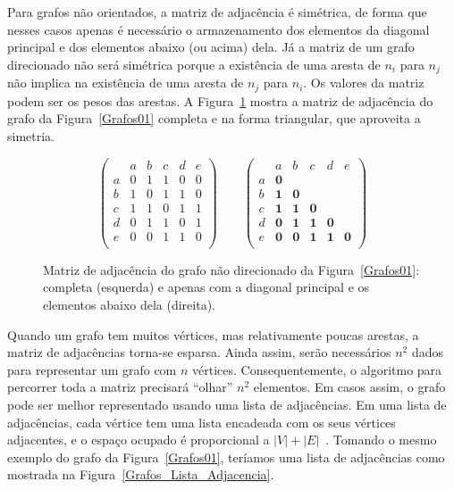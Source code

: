 \documentclass[11pt,fleqn]{book} %
\begin{document}
Para grafos não orientados, a matriz de adjacência é simétrica, de forma que nesses casos apenas é necessário o armazenamento dos elementos da diagonal principal e dos elementos abaixo (ou acima) dela.
Já a matriz de um grafo direcionado não será simétrica porque a existência de uma aresta de $n_i$ para $n_j$ não implica na existência de uma aresta de $n_j$ para $n_i$.
Os valores da matriz podem ser os pesos das arestas.
A Figura~\ref{Grafos_matrizes_adjacencia} mostra a matriz de adjacência do grafo da Figura~\ref{Grafos01} completa e na forma triangular, que aproveita a simetria.
\begin{center}
\begin{figure}
\[
\left(
\begin{array}{c|ccccc}
~ & a & b & c & d & e \\ \hline
a & 0 & 1 & 1 & 0 & 0 \\
b & 1 & 0 & 1 & 1 & 0 \\
c & 1 & 1 & 0 & 1 & 1 \\
d & 0 & 1 & 1 & 0 & 1 \\
e & 0 & 0 & 1 & 1 & 0 \\
\end{array}
\right)
\qquad
\left(
\begin{array}{c|ccccc}
~ & a & b & c & d & e \\ \hline
a & \textbf{0} & ~ & ~ & ~ & ~ \\
b & \textbf{1} & \textbf{0} & ~ & ~ & ~ \\
c & \textbf{1} & \textbf{1} & \textbf{0} & ~ & ~ \\
d & \textbf{0} & \textbf{1} & \textbf{1} & \textbf{0} & ~ \\
e & \textbf{0} & \textbf{0} & \textbf{1} & \textbf{1} & \textbf{0} \\
\end{array}\right)
\]
\caption{Matriz de adjacência do grafo não direcionado da Figura~\ref{Grafos01}: completa (esquerda) e apenas com a diagonal principal e os elementos abaixo dela (direita).}
\label{Grafos_matrizes_adjacencia}
\end{figure}
\end{center}

Quando um grafo tem muitos vértices, mas relativamente poucas arestas, a matriz de adjacências torna-se esparsa.
Ainda assim, serão necessários $n^2$ dados para representar um grafo com $n$ vértices.
Consequentemente, o algoritmo para percorrer toda a matriz precisará ``olhar'' $n^2$ elementos.
Em casos assim, o grafo pode ser melhor representado usando uma lista de adjacências.
Em uma lista de adjacências, cada vértice tem uma lista encadeada com os seus vértices adjacentes, e o espaço ocupado é proporcional a $|V| + |E|$~\cite{cormen2009}.
Tomando o mesmo exemplo do grafo da Figura~\ref{Grafos01}, teríamos uma lista de adjacências como mostrada na Figura~\ref{Grafos_Lista_Adjacencia}.
\usetikzlibrary{positioning}
\end{document}
